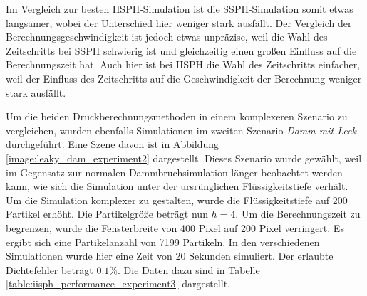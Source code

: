 \documentclass[11pt,
a4paper,
parskip=half, %
BCOR=10mm, %
english,
ngerman]{scrreprt}
\begin{document}
Im Vergleich zur besten IISPH-Simulation ist die SSPH-Simulation somit etwas langsamer, wobei der Unterschied hier weniger stark ausfällt.
Der Vergleich der Berechnungsgeschwindigkeit ist jedoch etwas unpräzise,
weil die Wahl des Zeitschritts bei SSPH schwierig ist und gleichzeitig einen großen Einfluss auf die Berechnungszeit hat.
Auch hier ist bei IISPH die Wahl des Zeitschritts einfacher, weil der Einfluss des Zeitschritts auf die Geschwindigkeit der Berechnung weniger stark ausfällt.


Um die beiden Druckberechnungsmethoden in einem komplexeren Szenario zu vergleichen,
wurden ebenfalls Simulationen im zweiten Szenario \textit{Damm mit Leck} durchgeführt.
Eine Szene davon ist in Abbildung \ref{image:leaky_dam_experiment2} dargestellt.
Dieses Szenario wurde gewählt, weil im Gegensatz zur normalen Dammbruchsimulation länger beobachtet werden kann,
wie sich die Simulation unter der ursrünglichen Flüssigkeitstiefe verhält.
Um die Simulation komplexer zu gestalten, wurde die Flüssigkeitstiefe auf 200 Partikel erhöht.
Die Partikelgröße beträgt nun $h = 4$.
Um die Berechnungszeit zu begrenzen, wurde die Fensterbreite von 400 Pixel auf 200 Pixel verringert.
Es ergibt sich eine Partikelanzahl von 7199 Partikeln.
In den verschiedenen Simulationen wurde hier eine Zeit von 20 Sekunden simuliert.
Der erlaubte Dichtefehler beträgt $0.1 \%$.
Die Daten dazu sind in Tabelle \ref{table:iisph_performance_experiment3} dargestellt.
\end{document}
